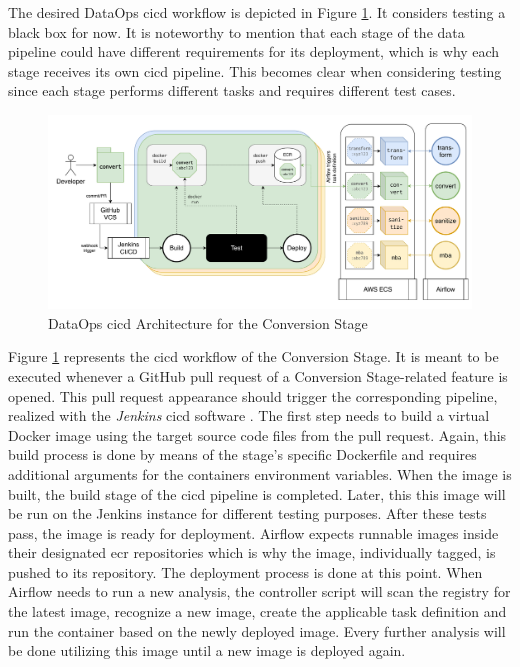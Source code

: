 The desired DataOps \ac{cicd} workflow is depicted in Figure \ref{fig:5-cicd}. It considers testing a black box for now. It is noteworthy to mention that each stage of the data pipeline could have different requirements for its deployment, which is why each stage receives its own \ac{cicd} pipeline. This becomes clear when considering testing since each stage performs different tasks and requires different test cases.

\begin{figure}[h!]
	\centering
	\includegraphics[width=\linewidth]{main-matter/img/5-cicd.pdf}
	\caption{DataOps \acs{cicd} Architecture for the Conversion Stage}
	\label{fig:5-cicd}
\end{figure}

Figure \ref{fig:5-cicd} represents the \ac{cicd} workflow of the Conversion Stage. It is meant to be executed whenever a GitHub pull request of a Conversion Stage-related feature is opened. This pull request appearance should trigger the corresponding pipeline, realized with the \textit{Jenkins} \ac{cicd} software \cite{jenkins}. The first step needs to build a virtual Docker image using the target source code files from the pull request. Again, this build process is done by means of the stage's specific Dockerfile and requires additional arguments for the containers environment variables. When the image is built, the build stage of the \ac{cicd} pipeline is completed. Later, this this image will be run on the Jenkins instance for different testing purposes. After these tests pass, the image is ready for deployment. Airflow expects runnable images inside their designated \ac{ecr} repositories which is why the image, individually tagged, is pushed to its repository. The deployment process is done at this point. When Airflow needs to run a new analysis, the controller script will scan the registry for the latest image, recognize a new image, create the applicable task definition and run the container based on the newly deployed image. Every further analysis will be done utilizing this image until a new image is deployed again.

